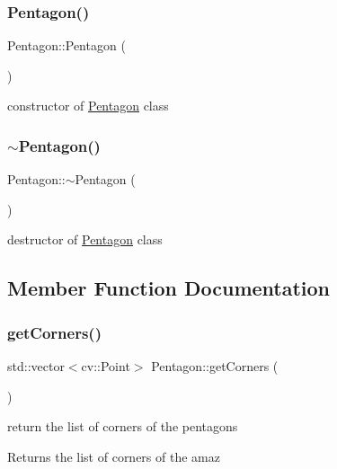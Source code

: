 \subsubsection{\texorpdfstring{Pentagon()}{Pentagon()}}
{\footnotesize\ttfamily Pentagon\+::\+Pentagon (\begin{DoxyParamCaption}{ }\end{DoxyParamCaption})}

constructor of \mbox{\hyperlink{class_pentagon}{Pentagon}} class \mbox{\label{class_pentagon_a500031431177cee506fd7f0517d84753}} 
\subsubsection{\texorpdfstring{$\sim$\+Pentagon()}{~Pentagon()}}
{\footnotesize\ttfamily Pentagon\+::$\sim$\+Pentagon (\begin{DoxyParamCaption}{ }\end{DoxyParamCaption})}

destructor of \mbox{\hyperlink{class_pentagon}{Pentagon}} class 

\subsection{Member Function Documentation}
\mbox{\label{class_pentagon_ab38482973f796da34cd9ac62cefb1491}} 
\subsubsection{\texorpdfstring{get\+Corners()}{getCorners()}}
{\footnotesize\ttfamily std\+::vector$<$cv\+::\+Point$>$ Pentagon\+::get\+Corners (\begin{DoxyParamCaption}{ }\end{DoxyParamCaption})}

return the list of corners of the pentagons \begin{DoxyReturn}{Returns}
the list of corners of the amaz 
\end{DoxyReturn}
\mbox{\label{class_pentagon_a42c8df4cbb1fcf985c96c9886a21c70a}} 
